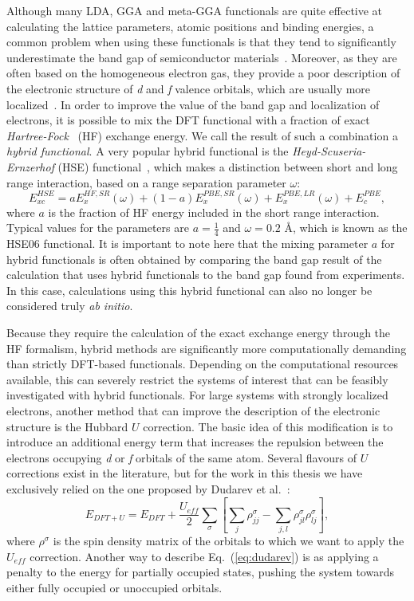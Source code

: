 \begin{refsection}
 \label{dft:sec-hybrid}
Although many LDA, GGA and meta-GGA functionals are quite effective at calculating the lattice parameters, atomic positions and binding energies, a common problem when using these functionals is that they tend to significantly underestimate the band gap of semiconductor materials~\cite{Tran2007}. Moreover, as they are often based on the homogeneous electron gas, they provide a poor description of the electronic structure of \textit{d} and \textit{f} valence orbitals, which are usually more localized~. In order to improve the value of the band gap and localization of electrons, it is possible to mix the DFT functional with a fraction of exact \textit{Hartree-Fock}~\cite{Slater1951} (HF) exchange energy. We call the result of such a combination a \textit{hybrid functional}. A very popular hybrid functional is the \textit{Heyd-Scuseria-Ernzerhof} (HSE) functional~\cite{Heyd2003}, which makes a distinction between short and long range interaction, based on a range separation parameter $\omega$:
\begin{equation}
E_{xc}^{HSE} = a E_{x}^{HF,SR}(\omega) + (1-a) E_{x}^{PBE,SR}(\omega) + E_{x}^{PBE,LR}(\omega) + E_{c}^{PBE},
\end{equation}
where $a$ is the fraction of HF energy included in the short range interaction. Typical values for the parameters are $a = \frac{1}{4}$ and $\omega = 0.2$ \AA, which is known as the HSE06 functional. It is important to note here that the mixing parameter $a$ for hybrid functionals is often obtained by comparing the band gap result of the calculation that uses hybrid functionals to the band gap found from experiments. In this case, calculations using this hybrid functional can also no longer be considered truly \textit{ab initio}.

Because they require the calculation of the exact exchange energy through the HF formalism, hybrid methods are significantly more computationally demanding than strictly DFT-based functionals. Depending on the computational resources available, this can severely restrict the systems of interest that can be feasibly investigated with hybrid functionals. For large systems with strongly localized electrons, another method that can improve the description of the electronic structure is the Hubbard $U$ correction. The basic idea of this modification is to introduce an additional energy term that increases the repulsion between the electrons occupying \textit{d} or \textit{f} orbitals of the same atom. Several flavours of $U$ corrections exist in the literature, but for the work in this thesis we have exclusively relied on the one proposed by Dudarev et al.~\cite{Dudarev1998}:
\begin{equation}\label{eq:dudarev}
E_{DFT+U} = E_{DFT} + \frac{U_{eff}}{2} \sum_\sigma \left[ \sum_j \rho_{jj}^\sigma - \sum_{j, l} \rho_{jl}^\sigma\rho_{lj}^\sigma\right],
\end{equation}
where $\rho^\sigma$ is the spin density matrix of the orbitals to which we want to apply the $U_{eff}$ correction. Another way to describe Eq.~(\ref{eq:dudarev}) is as applying a penalty to the energy for partially occupied states, pushing the system towards either fully occupied or unoccupied orbitals.


\end{refsection}
